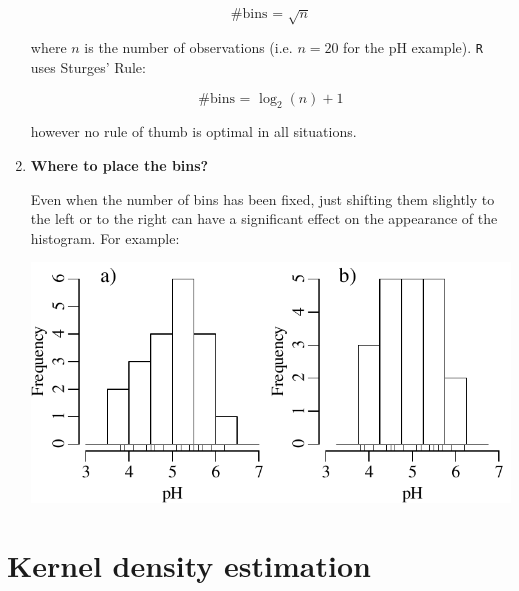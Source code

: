 \begin{enumerate}
  \begin{equation}
    \mbox{\#{bins} = } \sqrt{n}
  \end{equation}

  \noindent where $n$ is the number of observations (i.e. $n = 20$ for
  the pH example). \texttt{R} uses Sturges' Rule:

  \begin{equation}
    \mbox{\#{bins} = } \log_2(n) + 1
  \end{equation}

  \noindent however no rule of thumb is optimal in all situations.

\item\textbf{Where to place the bins?}

Even when the number of bins has been fixed, just shifting them
slightly to the left or to the right can have a significant effect on
the appearance of the histogram. For example:

\noindent\begin{minipage}[t][][b]{.55\linewidth}
  \includegraphics[width=\textwidth]{../figures/binpos.pdf}\medskip
\end{minipage}
\begin{minipage}[t][][t]{.45\linewidth}
  \label{fig:binpos}
\end{minipage}

\end{enumerate}

\section{Kernel density estimation}\label{sec:KDE}

